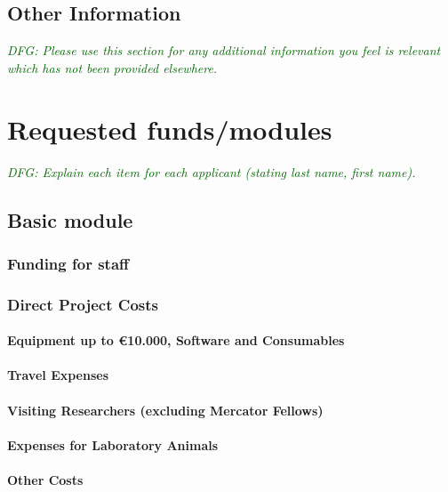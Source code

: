 \documentclass[a4paper,11pt]{amsart}
\theoremstyle{definition}
\newcommand{\<}{\langle}
\renewcommand{\>}{\rangle}
\newcommand{\dfg}[1]{\emph{\textcolor{darkgreen}{DFG: #1}}}
\begin{document}
\subsection{Other Information}
\dfg{Please use this section for any additional information you feel
  is relevant which has not been provided elsewhere.}

\section{Requested funds/modules}
\dfg{Explain each item for each applicant (stating last name, first
  name).}

\subsection{Basic module}

\subsubsection{Funding for staff}

\lipsum[9]

\subsubsection{Direct Project Costs}

\paragraph{Equipment up to \euro 10.000, Software and Consumables}

\paragraph{Travel Expenses}

\paragraph{Visiting Researchers (excluding Mercator Fellows)}

\paragraph{Expenses for Laboratory Animals}

\paragraph{Other Costs}
\end{document}
